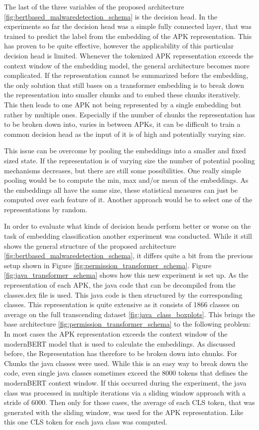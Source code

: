 The last of the three variables of the proposed architecture 
\ref{fig:bertbased_malwaredetection_schema}
is the decision head. 
In the experiments so far the decision head was a simple fully connected layer,
that was trained to predict the label from the embedding of the APK representation.
This has proven to be quite effective, however the applicability of this particular 
decision head is limited.
Whenever the tokenized APK representation exceeds the context window of the embedding 
model, the general architecture becomes more complicated.
If the representation cannot be summarized before the embedding, the only solution 
that still bases on a transformer embedding is to break down the representation into 
smaller chunks and to embed these chunks iteratively.
This then leads to one APK not being represented by a single 
embedding but rather by multiple ones.
Especially if the number of chunks the representation has to be broken down into, 
varies in between APKs, it can be difficult to train a common decision head as the 
input of it is of high and potentially varying size.

This issue can be overcome by pooling the embeddings into a smaller and fixed sized
state.
If the representation is of varying size the number of potential pooling mechanisms decreases,
but there are still some possibilities.
One really simple pooling would be to compute the min, max and/or mean of the embeddings.
As the embeddings all have the same size, these statistical measures can just be computed
over each feature of it.
Another approach would be to select one of the representations by random.

In order to evaluate what kinds of decision heads perform better or worse on 
the task of embedding classification another experiment was conducted.
While it still shows the general structure of the proposed architecture 
\ref{fig:bertbased_malwaredetection_schema}, it differs quite a bit from the 
previous setup shown in Figure \ref{fig:permission_transformer_schema}.
Figure \ref{fig:java_transformer_schema} shows how this new experiment is set up.
As the representation of each APK, the java code that can be decompiled from the
classes.dex file is used. This java code is then structured by the corresponding
classes. This representation is quite extensive as it consists of 1866
classes on average on the full transcending dataset \ref{fig:java_class_boxplots}.
This brings the base architecture \ref{fig:permission_transformer_schema} to
the following problem: In most cases the APK representation exceeds the context
window of the modernBERT model that is used to calculate the embeddings.
As discussed before, the Representation has therefore to be broken down into chunks.
For Chunks the java classes were used. While this is an easy way to break down the code,
even single java classes sometimes exceed the 8000 tokens that defines the 
modernBERT context window. If this occurred during the experiment, the java class was
processed in multiple iterations via a sliding window approach with a stride of 6000.
Then only for those cases, the average of each CLS token, that was generated with the
sliding window, was used for the APK representation. 
Like this one CLS token for each java class was computed.


